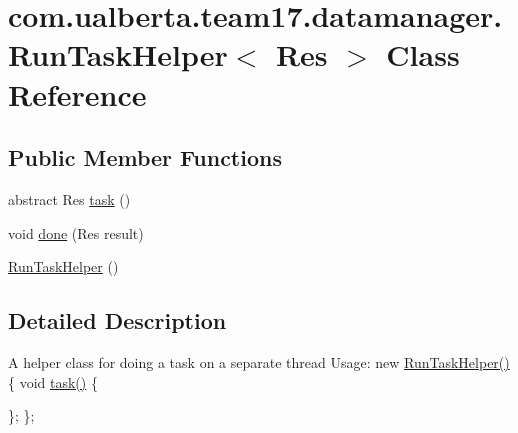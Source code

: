 \hypertarget{classcom_1_1ualberta_1_1team17_1_1datamanager_1_1_run_task_helper_3_01_res_01_4}{\section{com.\+ualberta.\+team17.\+datamanager.\+Run\+Task\+Helper$<$ Res $>$ Class Reference}
\label{classcom_1_1ualberta_1_1team17_1_1datamanager_1_1_run_task_helper_3_01_res_01_4}
}
\subsection*{Public Member Functions}
\begin{DoxyCompactItemize}
\item 
abstract Res \hyperlink{classcom_1_1ualberta_1_1team17_1_1datamanager_1_1_run_task_helper_3_01_res_01_4_a824efabca40f402563bb54c1e9ab9cbd}{task} ()
\item 
void \hyperlink{classcom_1_1ualberta_1_1team17_1_1datamanager_1_1_run_task_helper_3_01_res_01_4_ad59d814aaeca65cc86a7ebc45a4d2580}{done} (Res result)
\item 
\hyperlink{classcom_1_1ualberta_1_1team17_1_1datamanager_1_1_run_task_helper_3_01_res_01_4_a7c965a012da1abf536bbb71b428b6bd4}{Run\+Task\+Helper} ()
\end{DoxyCompactItemize}


\subsection{Detailed Description}
A helper class for doing a task on a separate thread Usage\+: new \hyperlink{classcom_1_1ualberta_1_1team17_1_1datamanager_1_1_run_task_helper_3_01_res_01_4_a7c965a012da1abf536bbb71b428b6bd4}{Run\+Task\+Helper()} \{ void \hyperlink{classcom_1_1ualberta_1_1team17_1_1datamanager_1_1_run_task_helper_3_01_res_01_4_a824efabca40f402563bb54c1e9ab9cbd}{task()} \{

\}; \}; 

